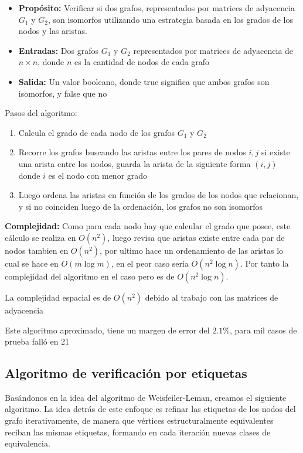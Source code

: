 \documentclass{article}
\begin{document}
\begin{itemize}
\item{\textbf{Propósito:} Verificar si dos grafos, representados por matrices de adyacencia $G_1$ y $G_2$, son isomorfos utilizando una estrategia basada en los grados de los nodos y las aristas.}
\item {\textbf{Entradas:} Dos grafos $G_1$ y $G_2$ representados por matrices de adyacencia de $n \times n$, donde $n$ es la cantidad de nodos de cada grafo}
\item {\textbf{Salida:} Un valor booleano, donde true significa que ambos grafos son isomorfos, y false que no}
\end{itemize}
Pasos del algoritmo:
\begin{enumerate}
\item{Calcula el grado de cada nodo de los grafos $G_1$ y $G_2$}
\item{Recorre los grafos buscando las aristas entre los pares de nodos $i,j$ si existe una arista entre los nodos, guarda la arista de la siguiente forma $(i,j)$ donde $i$ es el nodo con menor grado}
\item{Luego ordena las aristas en función de los grados de los nodos que relacionan, y si no coinciden luego de la ordenación, los grafos no son isomorfos}
\end{enumerate}

\textbf{Complejidad: } Como para cada nodo hay que calcular el grado que posee, este cálculo se realiza en $O(n^2)$, luego revisa que aristas existe entre cada par de nodos tambien en $O(n^2)$, por ultimo hace un ordenamiento de las aristas lo cual se hace en $O(m \log m)$, en el peor caso sería $O(n^2 \log n)$. Por tanto la complejidad del algoritmo en el caso pero es de $O(n^2\log n)$.

La complejidad espacial es de $O(n^2)$ debido al trabajo con las matrices de adyacencia

Este algoritmo aproximado, tiene un margen de error del $2.1\%$, para mil casos de prueba falló en 21

\subsection{Algoritmo de verificación por etiquetas}
Basándonos en la idea del algoritmo de Weisfeiler-Leman, creamos el siguiente algoritmo. La idea detrás de este enfoque es refinar las etiquetas de los nodos del grafo iterativamente, de manera que vértices estructuralmente equivalentes reciban las mismas etiquetas, formando en cada iteración nuevas clases de equivalencia.
\end{document}
